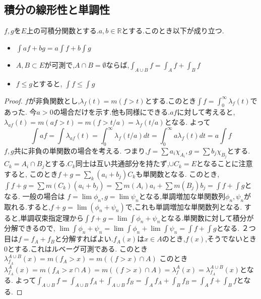 \subsection{積分の線形性と単調性}

\begin{thm}
$f,g$を$E$上の可積分関数とする.$a,b \in \mathbb{R}$とする.このとき以下が成り立つ.

\begin{itemize}
    \item $\int af + bg = a \int f + b \int g$
    \item $A, B \subset E$が可測で,$A \cap B = \emptyset$ならば,$\int_{A \cup B}f = \int_A f + \int_B f$
    \item $f \le g$とすると, $\int f \le \int g$
\end{itemize}
\end{thm}
\begin{proof}
$f$が非負関数とし,$\lambda_{f}(t) = m(f> t)$とする.このとき$\int f = \int_0^{\infty} \lambda_f(t)$であった.
今$a> 0$の場合だけを示す.他も同様にできる.$af $に対して考えると,$\lambda_{af}(t) = m(af > t) = m(f > t/a) = \lambda_{f}(t/a)$となる.
よって
\begin{equation*}
    \int af = \int \lambda_{af}(t) = \int_{0}^{\infty} \lambda_f(t/a) dt = \int_{0}^{\infty} a\lambda_f (t)dt =  a \int f
\end{equation*}
$f,g$共に非負の単関数の場合を考える.
つまり,$f = \sum a_i \chi_{A_i}, g = \sum b_j \chi_{B_j}$とする.$C_k = A_i \cap B_j$とする.$C_k$同士は互い共通部分を持たず,$\cup C_k = E$となることに注意すると,
このとき$f+g = \sum_{k} (a_i+b_j) C_k$も単関数となる.
このとき,$\int f+g =  \sum m(C_k)(a_i+b_j) = \sum m(A_i) a_i + \sum m(B_j) b_j = \int f + \int g$となる.
一般の場合は
$f = \lim \phi_n, g = \lim \psi_n$となる,単調増加な単関数列$\phi_n, \psi_n$が取れる.すると,$f + g = \lim (\phi_n + \psi_n)$で,これも単調増加な単関数列となる.
すると,単調収束指定理から$\int f + g = \lim \int \phi_n + \psi_n$となる.単関数に対して積分が分解できるので,
$\lim \int \phi_n + \psi_n = \lim \int \phi_n +  \lim \int \psi_n = \int f + \int g$となる.
２つ目は$f =  f_A + f_B$と分解すればよい.$f_A(x)$は$x \in A$のとき,$f(x)$,そうでないとき$0$とする.これはルベーグ可測である.
このとき$\lambda^{A \cup B}_{f_A}(x) = m(f_A > x) = m ( (f > x) \cap A) $
このとき$\lambda^{A}_{f_A}(x) = m(f_A > x \cap A) = m ( (f > x) \cap A) = \lambda^{A}_f(x) = \lambda^{A \cup B}_{f_A}(x)$となる.
よって$\int_{A \cup B} f =  \int_{A \cup B} f_A + \int_{A \cup B} f_B = \int_A f_A + \int_B f_B = \int_A f + \int_B f$となる.
\end{proof}


